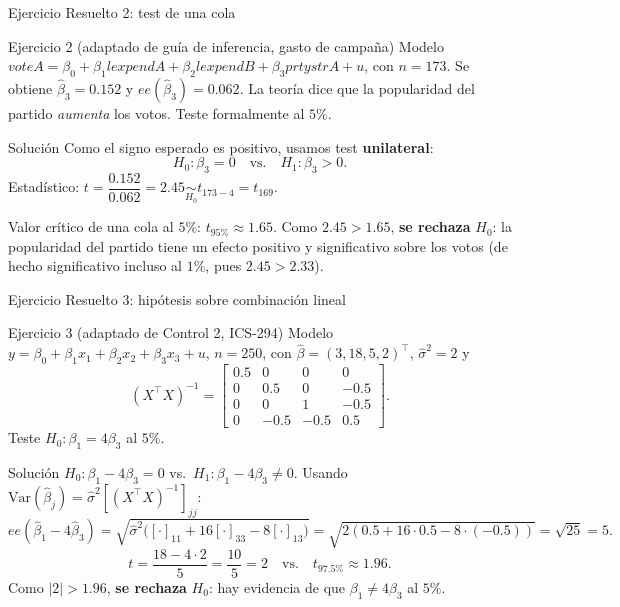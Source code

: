 \documentclass{beamer}
\begin{document}
\begin{frame}{Ejercicio Resuelto 2: test de una cola}

\begin{block}{Ejercicio 2 \scriptsize (adaptado de guía de inferencia, gasto de campaña)}
Modelo $voteA = \beta_0 + \beta_1 lexpendA + \beta_2 lexpendB + \beta_3 prtystrA + u$, con $n=173$. Se obtiene $\hat{\beta}_3 = 0.152$ y $ee(\hat{\beta}_3)=0.062$. La teoría dice que la popularidad del partido \emph{aumenta} los votos. Teste formalmente al $5\%$.
\end{block}

\pause

\begin{exampleblock}{Solución}
Como el signo esperado es positivo, usamos test \textbf{unilateral}:
\[
H_0:\beta_3 = 0 \quad\text{vs.}\quad H_1:\beta_3 > 0.
\]
Estadístico: $t = \dfrac{0.152}{0.062}=2.45 \underset{H_0}{\sim} t_{173-4}=t_{169}$.

Valor crítico de una cola al $5\%$: $t_{95\%}\approx 1.65$. Como $2.45 > 1.65$, \textbf{se rechaza} $H_0$: la popularidad del partido tiene un efecto positivo y significativo sobre los votos (de hecho significativo incluso al $1\%$, pues $2.45 > 2.33$).
\end{exampleblock}

\end{frame}

\begin{frame}{Ejercicio Resuelto 3: hipótesis sobre combinación lineal}

\begin{block}{Ejercicio 3 \scriptsize (adaptado de Control 2, ICS-294)}
Modelo $y=\beta_0+\beta_1 x_1+\beta_2 x_2+\beta_3 x_3 + u$, $n=250$, con $\hat{\beta}=(3,18,5,2)^\top$, $\hat{\sigma}^2=2$ y
\[
(X^\top X)^{-1}=\begin{bmatrix} 0.5&0&0&0\\ 0&0.5&0&-0.5\\ 0&0&1&-0.5\\ 0&-0.5&-0.5&0.5\end{bmatrix}.
\]
Teste $H_0:\beta_1 = 4\beta_3$ al $5\%$.
\end{block}

\pause

\begin{exampleblock}{Solución}
$H_0:\beta_1 - 4\beta_3 = 0$ vs.\ $H_1:\beta_1-4\beta_3\neq 0$. Usando $\text{Var}(\hat{\beta}_j)=\hat{\sigma}^2[(X^\top X)^{-1}]_{jj}$:
\[
ee(\hat{\beta}_1-4\hat{\beta}_3)=\sqrt{\hat\sigma^2\big([\cdot]_{11}+16[\cdot]_{33}-8[\cdot]_{13}\big)}
=\sqrt{2(0.5+16\cdot 0.5-8\cdot(-0.5))}=\sqrt{25}=5.
\]
\[
t = \frac{18-4\cdot 2}{5}=\frac{10}{5}=2 \quad\text{vs.}\quad t_{97.5\%}\approx 1.96.
\]
Como $|2|>1.96$, \textbf{se rechaza} $H_0$: hay evidencia de que $\beta_1 \neq 4\beta_3$ al $5\%$.
\end{exampleblock}

\end{frame}
\end{document}

